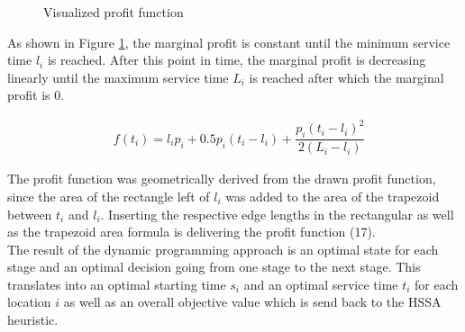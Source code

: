 \documentclass[final,5p,times,twocolumn]{elsarticle}
\begin{document}
{{\begin{figure}[htbp]
\caption{Visualized profit function}
\label{fig:graphPF}
\end{figure}

 As shown in Figure \ref{fig:graphPF}, the marginal profit is constant until the minimum service time $l_{i}$ is reached. After this point in time, the marginal profit is decreasing linearly until the maximum service time $L_{i}$ is reached after which the marginal profit is 0. 

\begin{align}
&f(t_{i}) = l_{i}p_{i} + 0.5p_{i}(t_{i}-l_{i}) + \dfrac{p_{i}(t_{i}-l_{i})^{2}}{2(L_{i}-l_{i})} 
\end{align}

The profit function was geometrically derived from the drawn profit function, since the area of the rectangle left of $l_{i}$ was added to the area of the trapezoid between $t_{i}$ and $l_{i}$. Inserting the respective edge lengths in the rectangular as well as the trapezoid area formula is delivering the profit function (17). \\  
The result of the dynamic programming approach is an optimal state for each stage and an optimal decision going from one stage to the next stage. This translates into an optimal starting time $s_{i}$ and an optimal service time $t_{i}$ for each location $i$ as well as an overall objective value which is send back to the HSSA heuristic.

}}
\end{document}
